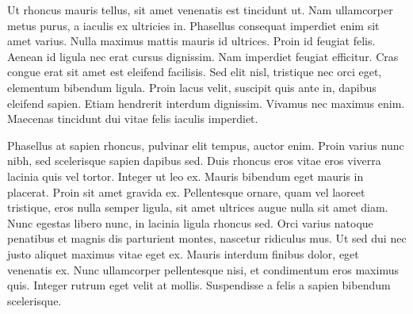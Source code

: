 \documentclass[12pt]{article}
\begin{document}
Ut rhoncus mauris tellus, sit amet venenatis est tincidunt ut. Nam ullamcorper metus purus, a iaculis ex ultricies in. Phasellus consequat imperdiet enim sit amet varius. Nulla maximus mattis mauris id ultrices. Proin id feugiat felis. Aenean id ligula nec erat cursus dignissim. Nam imperdiet feugiat efficitur. Cras congue erat sit amet est eleifend facilisis. Sed elit nisl, tristique nec orci eget, elementum bibendum ligula. Proin lacus velit, suscipit quis ante in, dapibus eleifend sapien. Etiam hendrerit interdum dignissim. Vivamus nec maximus enim. Maecenas tincidunt dui vitae felis iaculis imperdiet.

Phasellus at sapien rhoncus, pulvinar elit tempus, auctor enim. Proin varius nunc nibh, sed scelerisque sapien dapibus sed. Duis rhoncus eros vitae eros viverra lacinia quis vel tortor. Integer ut leo ex. Mauris bibendum eget mauris in placerat. Proin sit amet gravida ex. Pellentesque ornare, quam vel laoreet tristique, eros nulla semper ligula, sit amet ultrices augue nulla sit amet diam. Nunc egestas libero nunc, in lacinia ligula rhoncus sed. Orci varius natoque penatibus et magnis dis parturient montes, nascetur ridiculus mus. Ut sed dui nec justo aliquet maximus vitae eget ex. Mauris interdum finibus dolor, eget venenatis ex. Nunc ullamcorper pellentesque nisi, et condimentum eros maximus quis. Integer rutrum eget velit at mollis. Suspendisse a felis a sapien bibendum scelerisque.
\end{document}
